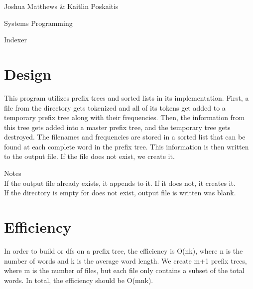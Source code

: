 \documentclass[letterpaper,12pt]{article}
\begin{document}
\noindent Joshua Matthews \& Kaitlin Poskaitis

\noindent Systems Programming

\noindent Indexer

\section*{Design}
This program utilizes prefix trees and sorted lists in its implementation.
First, a file from the directory gets tokenized and all of its tokens get added
to a temporary prefix tree along with their frequencies. Then, the information
from this tree gets added into a master prefix tree, and the temporary tree gets
destroyed.  The filenames and frequencies are stored in a sorted list that can be
found at each complete word in the prefix tree.  This information is then
written to the output file. If the file does not exist, we create it.

Notes\\
If the output file already exists, it appends to it. If it does not, it creates
it.\\
If the directory is empty for does not exist, output file is written was blank.

\section*{Efficiency}
In order to build or dfs on a prefix tree, the efficiency is O(nk), where n is
the number of words and k is the average word length.  We create m+1 prefix
trees, where m is the number of files, but each file only contains a subset of
the total words. In total, the efficiency should be O(mnk).
\end{document}
